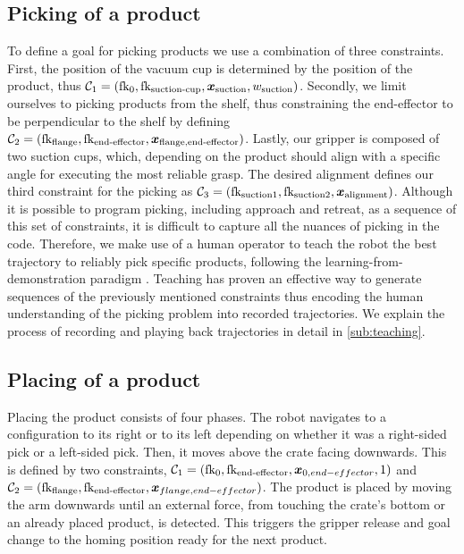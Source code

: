 \subsection{Picking of a product}
\label{sub:picking}
To define a goal for picking products we use a combination of three constraints.
First, the position of the vacuum cup is determined by the
position of the product, thus $\mathcal{C}_1 =
(\textrm{fk}_{\textrm{0}},\textrm{fk}_{\textrm{suction-cup}}, \bm{x}_{\textrm{suction}}, w_{\textrm{suction}})$. Secondly, we
limit  ourselves to picking products from the shelf, thus
constraining the end-effector to be perpendicular to the
shelf by defining $\mathcal{C}_2 = (\textrm{fk}_{\textrm{flange}},\textrm{fk}_{\textrm{end-effector}},
\bm{x}_{\textrm{flange,end-effector}})$. Lastly, our gripper is composed of two
suction cups, which, depending on the product should align with a specific angle for executing the most reliable grasp. The desired alignment defines
our third constraint for the picking as $\mathcal{C}_3 =
(\textrm{fk}_{\textrm{suction1}}, \textrm{fk}_{\textrm{suction2}}, \bm{x}_{\textrm{alignment}})$. Although it is possible to
program picking, including approach and retreat, as a sequence of this set of
constraints, it is difficult to capture all the nuances of
picking in the code. Therefore, we make use of a human operator to teach the robot the best trajectory to reliably pick specific products, following the 
learning-from-demonstration paradigm
\cite{celemin2022interactive}. Teaching has proven an effective way to generate sequences of the previously mentioned
constraints thus encoding the human understanding of the picking problem into recorded trajectories. We explain the process of
recording and playing back trajectories in detail in \cref{sub:teaching}. 
%

%

\subsection{Placing of a product}
\label{sub:place}

Placing the product consists of four phases. The robot navigates
to a configuration to its right or to its left depending on
whether it was a right-sided pick or a left-sided pick.
Then, it moves above the crate facing downwards. This is
defined by two constraints, $\mathcal{C}_1 =
(\textrm{fk}_{\textrm{0}},\textrm{fk}_{\textrm{end-effector}},
\bm{x}_{0,end-effector}, 1)$ and $\mathcal{C}_2 =
(\textrm{fk}_{\textrm{flange}},\textrm{fk}_{\textrm{end-effector}},
\bm{x}_{flange,end-effector})$.
The product is placed by moving the arm downwards until an
external force, from touching the crate's bottom
or an already placed product, is detected. This triggers the gripper
release and goal change to the homing
position ready for the next product.








